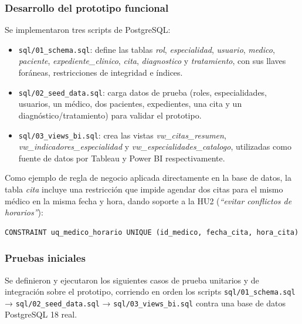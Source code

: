 \documentclass[12pt,letterpaper]{article}
\begin{document}
\subsubsection*{Desarrollo del prototipo funcional}

Se implementaron tres scripts de PostgreSQL:

\begin{itemize}
    \item \texttt{sql/01\_schema.sql}: define las tablas \textit{rol}, \textit{especialidad},
    \textit{usuario}, \textit{medico}, \textit{paciente}, \textit{expediente\_clinico},
    \textit{cita}, \textit{diagnostico} y \textit{tratamiento}, con sus llaves foráneas,
    restricciones de integridad e índices.
    \item \texttt{sql/02\_seed\_data.sql}: carga datos de prueba (roles, especialidades,
    usuarios, un médico, dos pacientes, expedientes, una cita y un diagnóstico/tratamiento)
    para validar el prototipo.
    \item \texttt{sql/03\_views\_bi.sql}: crea las vistas \textit{vw\_citas\_resumen},
    \textit{vw\_indicadores\_especialidad} y \textit{vw\_especialidades\_catalogo},
    utilizadas como fuente de datos por Tableau y Power BI respectivamente.
\end{itemize}

Como ejemplo de regla de negocio aplicada directamente en la base de datos, la tabla
\textit{cita} incluye una restricción que impide agendar dos citas para el mismo médico en
la misma fecha y hora, dando soporte a la HU2 (\textit{``evitar conflictos de horarios''}):

\begin{verbatim}
CONSTRAINT uq_medico_horario UNIQUE (id_medico, fecha_cita, hora_cita)
\end{verbatim}

\subsubsection*{Pruebas iniciales}

Se definieron y ejecutaron los siguientes casos de prueba unitarios y de integración sobre
el prototipo, corriendo en orden los scripts \texttt{sql/01\_schema.sql} →
\texttt{sql/02\_seed\_data.sql} → \texttt{sql/03\_views\_bi.sql} contra una base de datos
PostgreSQL 18 real.
\end{document}
